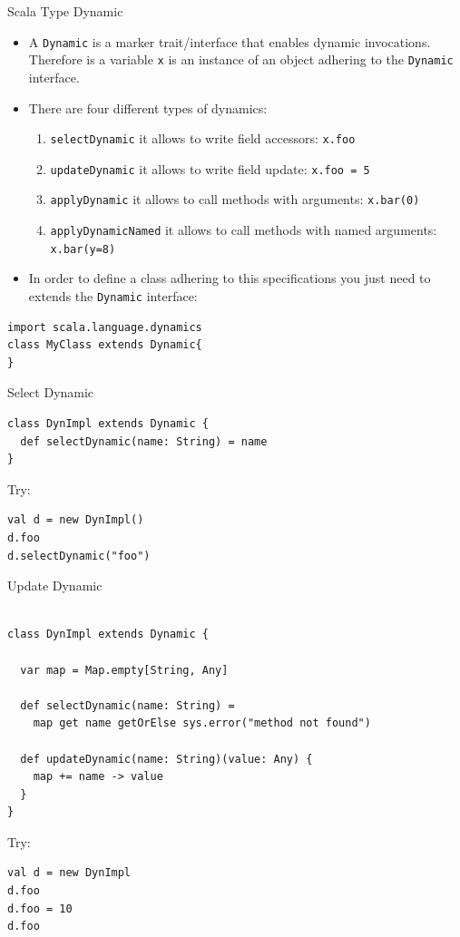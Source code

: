 \documentclass[presentation, aspectratio=169]{beamer}
\begin{document}
\begin{frame}[label={sec:org8c7c594},fragile]{Scala Type Dynamic}
 \begin{itemize}
\item A \texttt{Dynamic} is a marker trait/interface that enables dynamic invocations. 
Therefore is a variable \texttt{x} is an instance of an object adhering to the \texttt{Dynamic} interface.

\item There are four different types of dynamics:
\begin{enumerate}
\item \texttt{selectDynamic} it allows to write field accessors: \texttt{x.foo}

\item \texttt{updateDynamic} it allows to write field update: \texttt{x.foo = 5}

\item \texttt{applyDynamic} it allows to call methods with arguments: \texttt{x.bar(0)}

\item \texttt{applyDynamicNamed} it allows to call methods with named arguments: \texttt{x.bar(y=8)}
\end{enumerate}

\item In order to define a class adhering to this specifications you just need to extends 
the \texttt{Dynamic} interface:
\end{itemize}

\begin{verbatim}
import scala.language.dynamics
class MyClass extends Dynamic{ 
}
\end{verbatim}
\end{frame}


\begin{frame}[label={sec:org5ed76b8},fragile]{Select Dynamic}
 \begin{verbatim}
class DynImpl extends Dynamic {
  def selectDynamic(name: String) = name
}
\end{verbatim}
Try:
\begin{verbatim}
val d = new DynImpl()
d.foo 
d.selectDynamic("foo")
\end{verbatim}
\end{frame}


\begin{frame}[label={sec:org0918bd1},fragile]{Update Dynamic}
 \begin{verbatim}

class DynImpl extends Dynamic {

  var map = Map.empty[String, Any]

  def selectDynamic(name: String) =
    map get name getOrElse sys.error("method not found")

  def updateDynamic(name: String)(value: Any) {
    map += name -> value
  }
}
\end{verbatim}
Try:
\begin{verbatim}
val d = new DynImpl
d.foo 
d.foo = 10
d.foo
\end{verbatim}
\end{frame}
\end{document}
